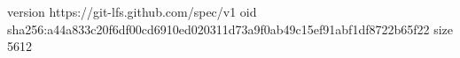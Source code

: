 version https://git-lfs.github.com/spec/v1
oid sha256:a44a833c20f6df00cd6910ed020311d73a9f0ab49c15ef91abf1df8722b65f22
size 5612
